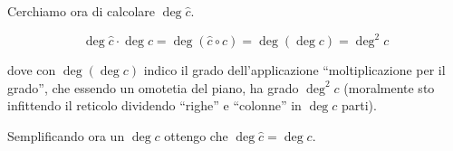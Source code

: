 	
	
	Cerchiamo ora di calcolare $\deg \hat c$.
	
	
	\[
		\deg \hat c \cdot \deg c = \deg(\hat c \circ c) = \deg(\deg c) = \deg^2 c
	\]
	
	dove con $\deg(\deg c)$ indico il grado dell'applicazione ``moltiplicazione per il grado'', che essendo un omotetia del piano, ha grado $\deg^2 c$ (moralmente sto infittendo il reticolo dividendo ``righe'' e ``colonne'' in $\deg c$ parti).
	
	Semplificando ora un $\deg c$ ottengo che $\deg \hat c = \deg c$.

	


	
	

